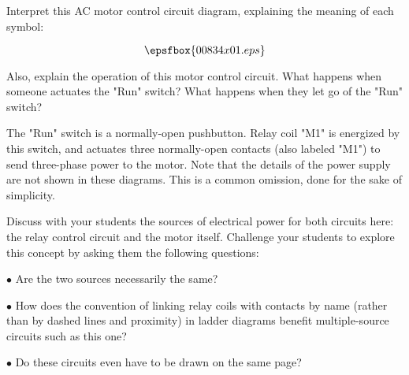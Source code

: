 

Interpret this AC motor control circuit diagram, explaining the meaning of each symbol:

$$\epsfbox{00834x01.eps}$$

Also, explain the operation of this motor control circuit.  What happens when someone actuates the "Run" switch?  What happens when they let go of the "Run" switch?







The "Run" switch is a normally-open pushbutton.  Relay coil "M1" is energized by this switch, and actuates three normally-open contacts (also labeled "M1") to send three-phase power to the motor.  Note that the details of the power supply are not shown in these diagrams.  This is a common omission, done for the sake of simplicity.







Discuss with your students the sources of electrical power for both circuits here: the relay control circuit and the motor itself.  Challenge your students to explore this concept by asking them the following questions: 

\medskip
\item{$\bullet$} Are the two sources necessarily the same?
\item{$\bullet$} How does the convention of linking relay coils with contacts by name (rather than by dashed lines and proximity) in ladder diagrams benefit multiple-source circuits such as this one?
\item{$\bullet$} Do these circuits even have to be drawn on the same page?
\medskip




